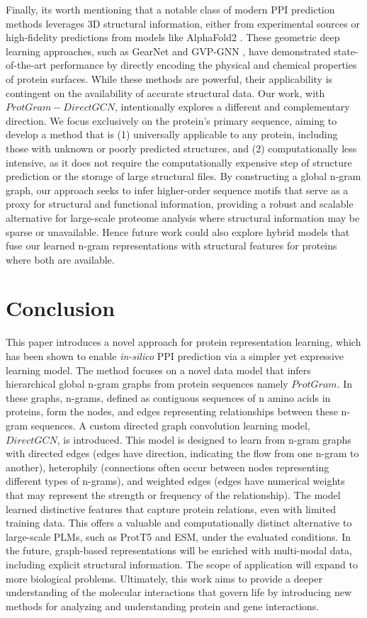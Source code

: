\documentclass[utf8]{FrontiersinHarvard}
\begin{document}
	Finally,  its worth mentioning that a notable class of modern PPI prediction methods leverages 3D structural information, either from experimental sources or high-fidelity predictions from models like AlphaFold2 \cite{jumper_highlyaccurateprotein_2021}. These geometric deep learning approaches, such as GearNet and GVP-GNN , have demonstrated state-of-the-art performance by directly encoding the physical and chemical properties of protein surfaces. While these methods are powerful, their applicability is contingent on the availability of accurate structural data. Our work, with $ProtGram-DirectGCN$, intentionally explores a different and complementary direction. We focus exclusively on the protein's primary sequence, aiming to develop a method that is (1) universally applicable to any protein, including those with unknown or poorly predicted structures, and (2) computationally less intensive, as it does not require the computationally expensive step of structure prediction or the storage of large structural files. By constructing a global n-gram graph, our approach seeks to infer higher-order sequence motifs that serve as a proxy for structural and functional information, providing a robust and scalable alternative for large-scale proteome analysis where structural information may be sparse or unavailable. Hence future work could also explore hybrid models that fuse our learned n-gram representations with structural features for proteins where both are available.
	
	\section{Conclusion}
	This paper introduces a novel approach for protein representation learning, which has been shown to enable \textit{in-silico} PPI prediction via a simpler yet expressive learning model. The method focuses on a novel data model that infers hierarchical global n-gram graphs from protein sequences namely $ProtGram$. In these graphs, n-grams, defined as contiguous sequences of n amino acids in proteins, form the nodes, and edges representing relationships between these n-gram sequences. A custom directed graph convolution learning model, $DirectGCN$, is introduced. This model is designed to learn from n-gram graphs with directed edges (edges have direction, indicating the flow from one n-gram to another), heterophily (connections often occur between nodes representing different types of n-grams), and weighted edges (edges have numerical weights that may represent the strength or frequency of the relationship). The model learned distinctive features that capture protein relations, even with limited training data. This offers a valuable and computationally distinct alternative to large-scale PLMs, such as ProtT5 and ESM, under the evaluated conditions. In the future, graph-based representations will be enriched with multi-modal data, including explicit structural information. The scope of application will expand to more biological problems. Ultimately, this work aims to provide a deeper understanding of the molecular interactions that govern life by introducing new methods for analyzing and understanding protein and gene interactions.
	
\end{document}
